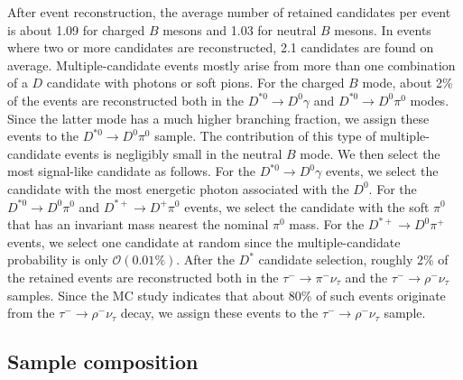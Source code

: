 \documentclass[aps,prd,twocolumn,superscriptaddress,showpacs,preprintnumbers,amsmath,amssymb]{revtex4-1}
\begin{document}
After event reconstruction, the average number of retained candidates per event is about 1.09 for charged $B$ mesons and 1.03 for neutral $B$ mesons. In events where two or more candidates are reconstructed, 2.1 candidates are found on average. Multiple-candidate events mostly arise from more than one combination of a $D$ candidate with photons or soft pions. For the charged $B$ mode, about 2\% of the events are reconstructed both in the $D^{*0} \rightarrow D^0 \gamma$ and $D^{*0} \rightarrow D^0 \pi^0$ modes. Since the latter mode has a much higher branching fraction, we assign these events to the $D^{*0} \rightarrow D^0 \pi^0$ sample. The contribution of this type of multiple-candidate events is negligibly small in the neutral $B$ mode. We then select the most signal-like candidate as follows. For the $D^{*0} \rightarrow D^0 \gamma$ events, we select the candidate with the most energetic photon associated with the $D^0$. For the $D^{*0} \rightarrow D^0 \pi^0$ and $D^{*+} \rightarrow D^+ \pi^0$ events, we select the candidate with the soft $\pi^0$ that has an invariant mass nearest the nominal $\pi^0$ mass. For the $D^{*+} \rightarrow D^0 \pi^+$ events, we select one candidate at random since the multiple-candidate probability is only $\mathcal{O}(0.01\%)$. After the $D^*$ candidate selection, roughly 2\% of the retained events are reconstructed both in the $\tau^- \rightarrow \pi^- \nu_\tau$ and the $\tau^- \rightarrow \rho^- \nu_{\tau}$ samples. Since the MC study indicates that about 80\% of such events originate from the $\tau^- \rightarrow \rho^- \nu_\tau$ decay, we assign these events to the $\tau^- \rightarrow \rho^- \nu_\tau$ sample.



\subsection{Sample composition}\label{sec:sample}
\end{document}
